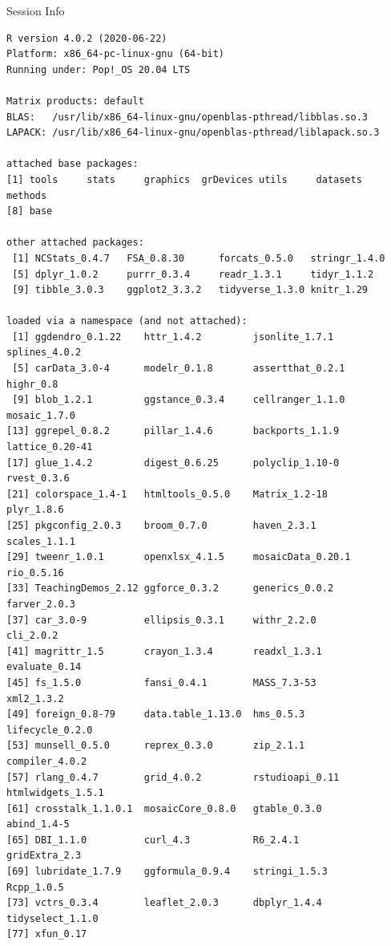 \documentclass[10pt]{beamer}\usepackage[]{graphicx}\usepackage[]{color}
\makeatletter
\newenvironment{kframe}{%
 \def\at@end@of@kframe{}%
 \ifinner\ifhmode%
  \def\at@end@of@kframe{\end{minipage}}%
  \begin{minipage}{\columnwidth}%
 \fi\fi%
 \def\FrameCommand##1{\hskip\@totalleftmargin \hskip-\fboxsep
 \colorbox{shadecolor}{##1}\hskip-\fboxsep
     \hskip-\linewidth \hskip-\@totalleftmargin \hskip\columnwidth}%
 \MakeFramed {\advance\hsize-\width
   \@totalleftmargin\z@ \linewidth\hsize
   \@setminipage}}%
 {\par\unskip\endMakeFramed%
 \at@end@of@kframe}
\newenvironment{knitrout}{}{} %
\makeatother
\begin{document}
\begin{frame}[fragile]{Session Info}
	\tiny
	
\begin{knitrout}\tiny
{}\color{fgcolor}\begin{kframe}
\begin{verbatim}
R version 4.0.2 (2020-06-22)
Platform: x86_64-pc-linux-gnu (64-bit)
Running under: Pop!_OS 20.04 LTS

Matrix products: default
BLAS:   /usr/lib/x86_64-linux-gnu/openblas-pthread/libblas.so.3
LAPACK: /usr/lib/x86_64-linux-gnu/openblas-pthread/liblapack.so.3

attached base packages:
[1] tools     stats     graphics  grDevices utils     datasets  methods  
[8] base     

other attached packages:
 [1] NCStats_0.4.7   FSA_0.8.30      forcats_0.5.0   stringr_1.4.0  
 [5] dplyr_1.0.2     purrr_0.3.4     readr_1.3.1     tidyr_1.1.2    
 [9] tibble_3.0.3    ggplot2_3.3.2   tidyverse_1.3.0 knitr_1.29     

loaded via a namespace (and not attached):
 [1] ggdendro_0.1.22    httr_1.4.2         jsonlite_1.7.1     splines_4.0.2     
 [5] carData_3.0-4      modelr_0.1.8       assertthat_0.2.1   highr_0.8         
 [9] blob_1.2.1         ggstance_0.3.4     cellranger_1.1.0   mosaic_1.7.0      
[13] ggrepel_0.8.2      pillar_1.4.6       backports_1.1.9    lattice_0.20-41   
[17] glue_1.4.2         digest_0.6.25      polyclip_1.10-0    rvest_0.3.6       
[21] colorspace_1.4-1   htmltools_0.5.0    Matrix_1.2-18      plyr_1.8.6        
[25] pkgconfig_2.0.3    broom_0.7.0        haven_2.3.1        scales_1.1.1      
[29] tweenr_1.0.1       openxlsx_4.1.5     mosaicData_0.20.1  rio_0.5.16        
[33] TeachingDemos_2.12 ggforce_0.3.2      generics_0.0.2     farver_2.0.3      
[37] car_3.0-9          ellipsis_0.3.1     withr_2.2.0        cli_2.0.2         
[41] magrittr_1.5       crayon_1.3.4       readxl_1.3.1       evaluate_0.14     
[45] fs_1.5.0           fansi_0.4.1        MASS_7.3-53        xml2_1.3.2        
[49] foreign_0.8-79     data.table_1.13.0  hms_0.5.3          lifecycle_0.2.0   
[53] munsell_0.5.0      reprex_0.3.0       zip_2.1.1          compiler_4.0.2    
[57] rlang_0.4.7        grid_4.0.2         rstudioapi_0.11    htmlwidgets_1.5.1 
[61] crosstalk_1.1.0.1  mosaicCore_0.8.0   gtable_0.3.0       abind_1.4-5       
[65] DBI_1.1.0          curl_4.3           R6_2.4.1           gridExtra_2.3     
[69] lubridate_1.7.9    ggformula_0.9.4    stringi_1.5.3      Rcpp_1.0.5        
[73] vctrs_0.3.4        leaflet_2.0.3      dbplyr_1.4.4       tidyselect_1.1.0  
[77] xfun_0.17         
\end{verbatim}
\end{kframe}
\end{knitrout}
	
\end{frame}
\end{document}
